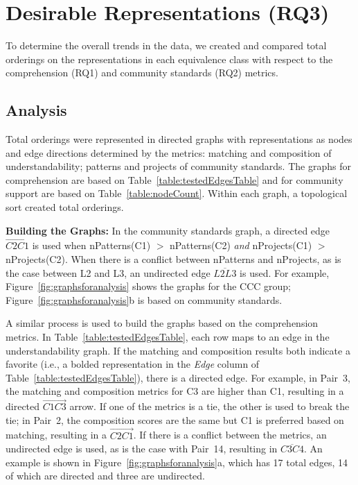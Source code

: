 

\section{Desirable Representations (RQ3)}
\label{sec:rq3}
To determine the overall trends in the data, we created and compared total orderings on the representations in each equivalence class with respect to the comprehension (RQ1) and community standards (RQ2) metrics.

\subsection{Analysis}
Total orderings were represented in directed graphs with representations as nodes and edge directions determined by the metrics: matching and composition of understandability; patterns and projects of community standards. The graphs for comprehension are based on Table~\ref{table:testedEdgesTable} and for community support are based on Table~\ref{table:nodeCount}. Within each graph, a topological sort created total orderings.





\textbf{Building the Graphs:}
In the community standards graph, a directed edge $\overrightarrow{C2 C1}$ is used when nPatterns(C1) $>$ nPatterns(C2) \emph{and} nProjects(C1) $>$ nProjects(C2).
When there is a conflict between nPatterns and nProjects, as is the case between L2 and L3,
an undirected edge $\overline{L2L3}$ is used. %
For example, Figure~\ref{fig:graphsforanalysis} shows the graphs for the CCC group; Figure~\ref{fig:graphsforanalysis}b is based on community standards.

A similar process is used to build the graphs based on the comprehension metrics.
In Table~\ref{table:testedEdgesTable}, each row maps to an edge in the understandability graph.
If the matching and composition results both indicate a favorite (i.e., a bolded representation in the {\em Edge} column of Table~\ref{table:testedEdgesTable}), there is a directed edge. For example, in Pair~3, the matching and composition metrics for C3 are higher than C1, resulting in a directed $\overrightarrow{C1 C3}$ arrow. If one of the metrics is a tie, the other is used to break the tie; in Pair~2, the composition scores are the same but C1 is preferred based on matching, resulting in a $\overrightarrow{C2 C1}$. If there is a conflict between the metrics, an undirected edge is used, as is the case with Pair~14, resulting in $\overline{C3 C4}$.
An example is shown in Figure~\ref{fig:graphsforanalysis}a, which has 17 total edges, 14 of which are directed and three are undirected.

